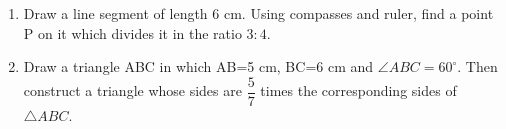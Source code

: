 
\begin{enumerate}
    \item Draw a line segment of length 6 cm. Using compasses and ruler, find a point P on it which divides it in the ratio $3:4$.
    \item Draw a triangle ABC in which AB=5 cm, BC=6 cm and $\angle ABC=60^\circ$. Then construct a triangle whose sides are $\dfrac{5}{7}$ times the corresponding sides of $\triangle ABC$.
\end{enumerate}
